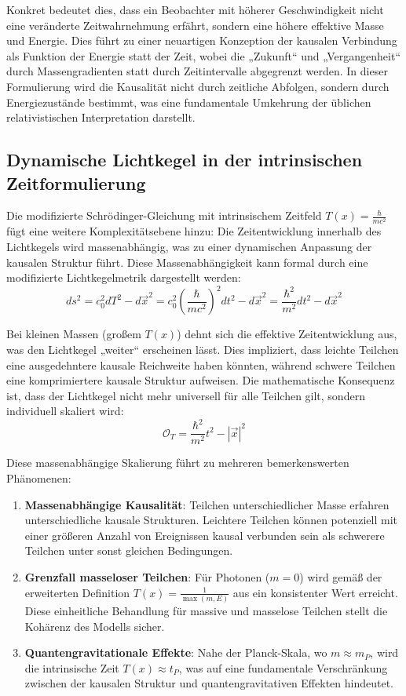 \documentclass[a4paper,12pt]{article}
\newcommand{\Tfield}{T(x)}
\begin{document}
	Konkret bedeutet dies, dass ein Beobachter mit höherer Geschwindigkeit nicht eine veränderte Zeitwahrnehmung erfährt, sondern eine höhere effektive Masse und Energie. Dies führt zu einer neuartigen Konzeption der kausalen Verbindung als Funktion der Energie statt der Zeit, wobei die „Zukunft“ und „Vergangenheit“ durch Massengradienten statt durch Zeitintervalle abgegrenzt werden. In dieser Formulierung wird die Kausalität nicht durch zeitliche Abfolgen, sondern durch Energiezustände bestimmt, was eine fundamentale Umkehrung der üblichen relativistischen Interpretation darstellt.
	
	\subsection{Dynamische Lichtkegel in der intrinsischen Zeitformulierung}
	Die modifizierte Schrödinger-Gleichung mit intrinsischem Zeitfeld \(\Tfield = \frac{\hbar}{m c^2}\) fügt eine weitere Komplexitätsebene hinzu: Die Zeitentwicklung innerhalb des Lichtkegels wird massenabhängig, was zu einer dynamischen Anpassung der kausalen Struktur führt. Diese Massenabhängigkeit kann formal durch eine modifizierte Lichtkegelmetrik dargestellt werden:
	\begin{equation}
		ds^2 = c_0^2 dT^2 - d\vec{x}^2 = c_0^2 \left(\frac{\hbar}{m c^2}\right)^2 dt^2 - d\vec{x}^2 = \frac{\hbar^2}{m^2} dt^2 - d\vec{x}^2
	\end{equation}
	
	Bei kleinen Massen (großem \(\Tfield\)) dehnt sich die effektive Zeitentwicklung aus, was den Lichtkegel „weiter“ erscheinen lässt. Dies impliziert, dass leichte Teilchen eine ausgedehntere kausale Reichweite haben könnten, während schwere Teilchen eine komprimiertere kausale Struktur aufweisen. Die mathematische Konsequenz ist, dass der Lichtkegel nicht mehr universell für alle Teilchen gilt, sondern individuell skaliert wird:
	\begin{equation}
		\mathcal{O}_T = \frac{\hbar^2}{m^2} t^2 - |\vec{x}|^2
	\end{equation}
	
	Diese massenabhängige Skalierung führt zu mehreren bemerkenswerten Phänomenen:
	\begin{enumerate}
		\item \textbf{Massenabhängige Kausalität}: Teilchen unterschiedlicher Masse erfahren unterschiedliche kausale Strukturen. Leichtere Teilchen können potenziell mit einer größeren Anzahl von Ereignissen kausal verbunden sein als schwerere Teilchen unter sonst gleichen Bedingungen.
		\item \textbf{Grenzfall masseloser Teilchen}: Für Photonen (\( m = 0 \)) wird gemäß der erweiterten Definition \(\Tfield = \frac{1}{\max(m,E)}\) aus \cite{wesentlicheFormalismen}\relax ein konsistenter Wert erreicht. Diese einheitliche Behandlung für massive und masselose Teilchen stellt die Kohärenz des Modells sicher.
		\item \textbf{Quantengravitationale Effekte}: Nahe der Planck-Skala, wo \( m \approx m_P \), wird die intrinsische Zeit \(\Tfield \approx t_P\), was auf eine fundamentale Verschränkung zwischen der kausalen Struktur und quantengravitativen Effekten hindeutet.
	\end{enumerate}
	
\end{document}

